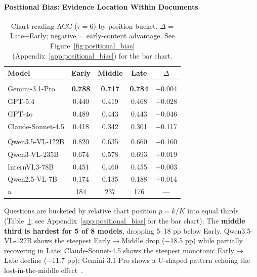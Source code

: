 \paragraph{Positional Bias: Evidence Location Within Documents}
\label{sec:positional_bias}


\begin{table}
  \centering
  \small
  \begin{tabular}{@{}lcccc@{}}
  \toprule
  \textbf{Model} & \textbf{Early} & \textbf{Middle} & \textbf{Late} & \textbf{$\Delta$} \\
  \midrule
  \rowcolor{gray!15} \multicolumn{5}{c}{\textit{Proprietary}} \\
  \midrule
  Gemini-3.1-Pro    & \textbf{0.788} & \textbf{0.717} & \textbf{0.784} & $-$0.004 \\
  GPT-5.4           & 0.440          & 0.419          & 0.468          & $+$0.028 \\
  GPT-4o            & 0.489          & 0.443          & 0.443          & $-$0.046 \\
  Claude-Sonnet-4.5 & 0.418          & 0.342          & 0.301          & $-$0.117 \\
  \midrule
  \rowcolor{gray!15} \multicolumn{5}{c}{\textit{Open-Weight}} \\
  \midrule
  Qwen3.5-VL-122B   & 0.820          & 0.635          & 0.660          & $-$0.160 \\
  Qwen3-VL-235B     & 0.674          & 0.578          & 0.693          & $+$0.019 \\
  InternVL3-78B     & 0.451          & 0.460          & 0.455          & $+$0.003 \\
  Qwen2.5-VL-7B     & 0.174          & 0.135          & 0.188          & $+$0.014 \\
  \midrule
  $n$               & 184            & 237            & 176            & --- \\
  \bottomrule
  \end{tabular}
  \caption{Chart-reading ACC ($\tau{=}6$) by position bucket.
    $\Delta$ = Late$-$Early; negative = early-content advantage.
    See Figure~\ref{fig:positional_bias} (Appendix~\ref{app:positional_bias}) for the bar chart.}
  \label{tab:positional_bias}
\end{table}

Questions are bucketed by relative chart position $p{=}k/K$ into equal thirds (Table~\ref{tab:positional_bias}; see Appendix~\ref{app:positional_bias} for the bar chart). The \textbf{middle third is hardest for 5 of 8 models}, dropping 5--18 pp below Early. Qwen3.5-VL-122B shows the steepest Early$\to$Middle drop ($-$18.5 pp) while partially recovering in Late; Claude-Sonnet-4.5 shows the steepest monotonic Early$\to$Late decline ($-$11.7 pp); Gemini-3.1-Pro shows a U-shaped pattern echoing the lost-in-the-middle effect~\citep{liu2023lostmiddlelanguagemodels}.

